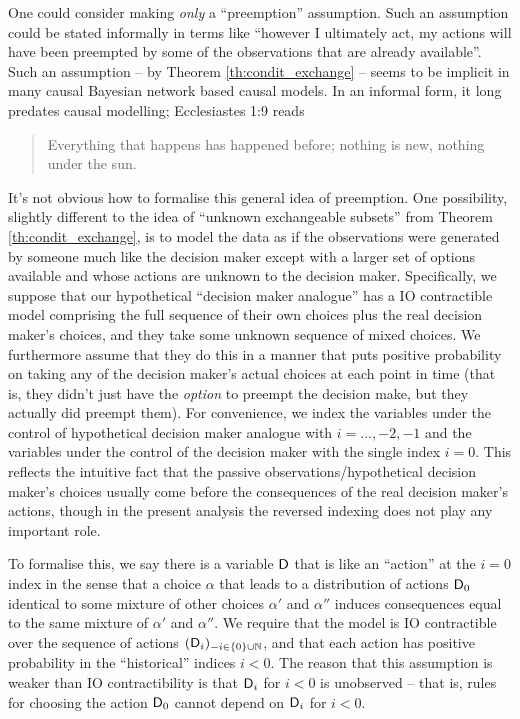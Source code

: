 One could consider making \emph{only} a ``preemption'' assumption. Such an assumption could be stated informally in terms like ``however I ultimately act, my actions will have been preempted by some of the observations that are already available''. Such an assumption -- by Theorem \ref{th:condit_exchange} -- seems to be implicit in many causal Bayesian network based causal models. In an informal form, it long predates causal modelling; Ecclesiastes 1:9 reads
\begin{quote}
Everything that happens has happened before; nothing is new, nothing under the sun.\citep{noauthor_holy_1995}
\end{quote}

It's not obvious how to formalise this general idea of preemption. One possibility, slightly different to the idea of ``unknown exchangeable subsets'' from Theorem \ref{th:condit_exchange}, is to model the data as if the observations were generated by someone much like the decision maker except with a larger set of options available and whose actions are unknown to the decision maker. Specifically, we suppose that our hypothetical ``decision maker analogue'' has a IO contractible model comprising the full sequence of their own choices plus the real decision maker's choices, and they take some unknown sequence of mixed choices. We furthermore assume that they do this in a manner that puts positive probability on taking any of the decision maker's actual choices at each point in time (that is, they didn't just have the \emph{option} to preempt the decision make, but they actually did preempt them). For convenience, we index the variables under the control of hypothetical decision maker analogue with  $i=...,-2,-1$ and the variables under the control of the decision maker with the single index $i=0$. This reflects the intuitive fact that the passive observations/hypothetical decision maker's choices usually come before the consequences of the real decision maker's actions, though in the present analysis the reversed indexing does not play any important role.

To formalise this, we say there is a variable $\mathsf{D}$ that is like an ``action'' at the $i=0$ index in the sense that a choice $\alpha$ that leads to a distribution of actions $\mathsf{D}_0$ identical to some mixture of other choices $\alpha'$ and $\alpha''$ induces consequences equal to the same mixture of $\alpha'$ and $\alpha''$. We require that the model is IO contractible over the sequence of actions $(\mathsf{D}_i)_{-i\in \{0\}\cup\mathbb{N}}$, and that each action has positive probability in the ``historical'' indices $i<0$. The reason that this assumption is weaker than IO contractibility is that $\mathsf{D}_i$ for $i<0$ is unobserved -- that is, rules for choosing the action $\mathsf{D}_0$ cannot depend on $\mathsf{D}_i$ for $i<0$.

